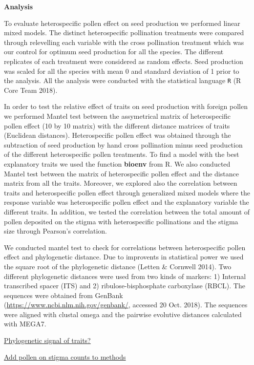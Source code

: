 \documentclass[11pt,a4paper]{article}
\begin{document}
\textbf{Analysis}

To evaluate heterospecific pollen effect on seed production we performed
linear mixed models. The distinct heterospecific pollination treatments
were compared through relevelling each variable with the cross
pollination treatment which was our control for optimum seed production
for all the species. The different replicates of each treatment were
considered as random effects. Seed production was scaled for all the
species with mean 0 and standard deviation of 1 prior to the analysis.
All the analysis were conducted with the statistical language \texttt{R}
(R Core Team 2018).

In order to test the relative effect of traits on seed production with
foreign pollen we performed Mantel test between the assymetrical matrix
of heterospecific pollen effect (10 by 10 matrix) with the different
distance matrices of traits (Euclidean distances). Heterospecific pollen
effect was obtained through the subtraction of seed production by hand
cross pollination minus seed production of the different heterospecific
pollen treatments. To find a model with the best explanatory traits we
used the function \textbf{bioenv} from R. We also conducted Mantel test
between the matrix of heterospecific pollen effect and the distance
matrix from all the traits. Moreover, we explored also the correlation
between traits and heterospecific pollen effect through generalized
mixed models where the response variable was heterospecific pollen
effect and the explanatory variable the different traits. In addition,
we tested the correlation between the total amount of pollen deposited
on the stigma with heterospecific pollinations and the stigma size
through Pearson's correlation.

We conducted mantel test to check for correlations between
heterospecific pollen effect and phylogenetic distance. Due to
improvents in statistical power we used the square root of the
phylogenetic distance (Letten \& Cornwell 2014). Two different
phylogenetic distances were used from two kinds of markers: 1) Internal
transcribed spacer (ITS) and 2) ribulose-bisphosphate carboxylase
(RBCL). The sequences were obtained from GenBank
(\url{https://www.ncbi.nlm.nih.gov/genbank/}, accessed 20 Oct. 2018).
The sequences were aligned with clustal omega and the pairwise evolutive
distances calculated with MEGA7.

\href{Jose}{Phylogenetic signal of traits?}

\href{Jose}{Add pollen on stigma counts to methods}
\end{document}
